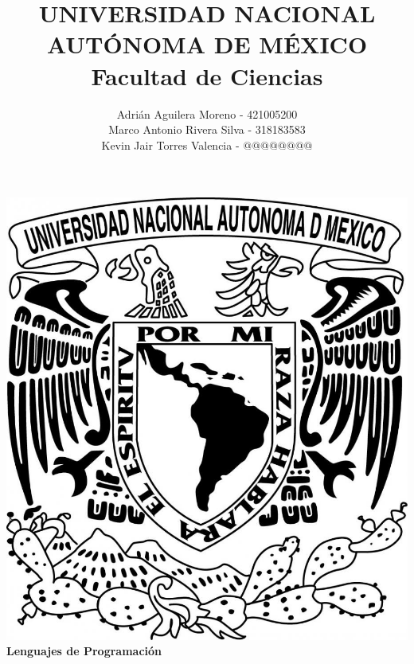 \title{UNIVERSIDAD NACIONAL AUT\'ONOMA DE M\'EXICO\\ Facultad de Ciencias}
\author{ Adri\'an Aguilera Moreno   - 421005200 \\
         Marco Antonio Rivera Silva - 318183583\\
         Kevin Jair Torres Valencia - $@@@@@@@@$}
\date{}
\maketitle
\begin{center}
  \includegraphics[scale=0.20]{../Portada/Portada}\\[0.4cm]
  \Large
  \bf{Lenguajes de Programación}
  \normalsize
\end{center}
\newpage
{}

